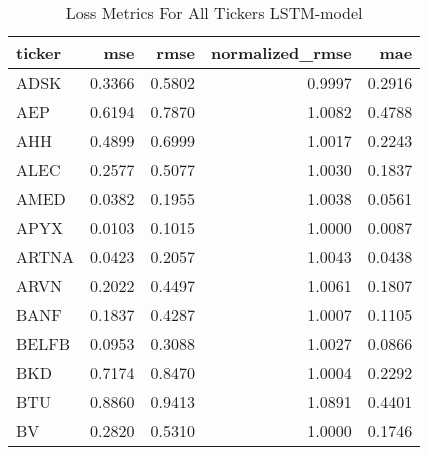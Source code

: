 \begin{table}
\caption{Loss Metrics For All Tickers LSTM-model}
\label{tab:loss_total_lstm}
\begin{tabular}{lrrrr}
\toprule
ticker & mse & rmse & normalized_rmse & mae \\
\midrule
ADSK & 0.3366 & 0.5802 & 0.9997 & 0.2916 \\
AEP & 0.6194 & 0.7870 & 1.0082 & 0.4788 \\
AHH & 0.4899 & 0.6999 & 1.0017 & 0.2243 \\
ALEC & 0.2577 & 0.5077 & 1.0030 & 0.1837 \\
AMED & 0.0382 & 0.1955 & 1.0038 & 0.0561 \\
APYX & 0.0103 & 0.1015 & 1.0000 & 0.0087 \\
ARTNA & 0.0423 & 0.2057 & 1.0043 & 0.0438 \\
ARVN & 0.2022 & 0.4497 & 1.0061 & 0.1807 \\
BANF & 0.1837 & 0.4287 & 1.0007 & 0.1105 \\
BELFB & 0.0953 & 0.3088 & 1.0027 & 0.0866 \\
BKD & 0.7174 & 0.8470 & 1.0004 & 0.2292 \\
BTU & 0.8860 & 0.9413 & 1.0891 & 0.4401 \\
BV & 0.2820 & 0.5310 & 1.0000 & 0.1746 \\
\bottomrule
\end{tabular}
\end{table}
